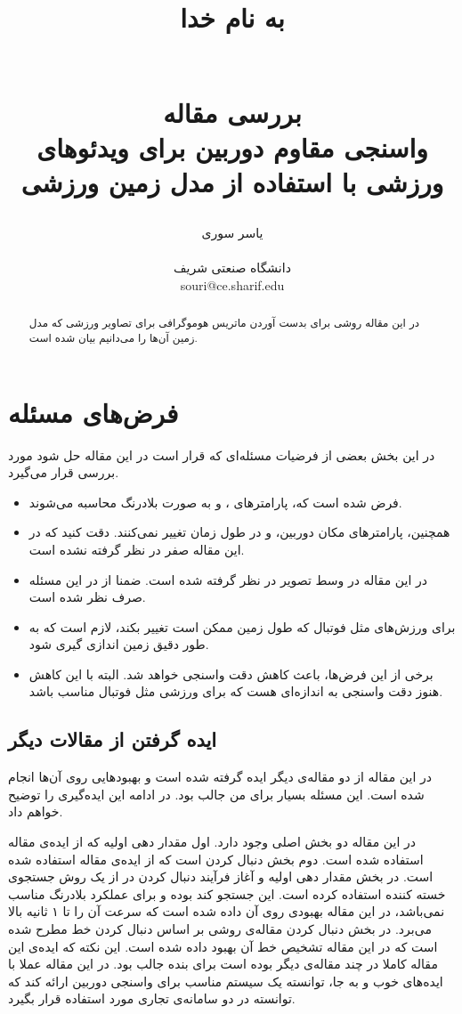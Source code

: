 \documentclass{report}
\title{
\begin{normalsize}
به نام خدا
\end{normalsize}
\\[2cm]
بررسی مقاله
\\[1cm]
واسنجی مقاوم دوربین برای ویدئوهای ورزشی با استفاده از مدل زمین ورزشی
}
\author{یاسر سوری
\\
\\ \small دانشگاه صنعتی شریف
\\ \small souri@ce.sharif.edu
}
\begin{document}
\maketitle

\begin{abstract}
در این مقاله روشی برای بدست آوردن ماتریس هوموگرافی برای تصاویر ورزشی که مدل زمین آن‌ها را می‌دانیم بیان شده است.

\end{abstract}

\section{فرض‌های مسئله}
در این بخش بعضی از فرضیات مسئله‌ای که قرار است در این مقاله حل شود مورد بررسی قرار می‌گیرد.
\begin{itemize}
\item
فرض شده است که، پارامتر‌های ،  و  به صورت بلادرنگ محاسبه می‌شوند.
\item
همچنین، پارامترهای مکان دوربین،  و  در طول زمان تغییر نمی‌کنند. دقت کنید که در این مقاله  صفر در نظر گرفته نشده است.
\item
در این مقاله  در وسط تصویر در نظر گرفته شده است. ضمنا از  در این مسئله صرف نظر شده است.
\item
برای ورزش‌های مثل فوتبال که طول زمین ممکن است تغییر بکند، لازم است که به طور دقیق زمین اندازی گیری شود.
\item
برخی از این فرض‌ها، باعث کاهش دقت واسنجی خواهد شد. البته با این کاهش هنوز دقت واسنجی به اندازه‌ای هست که برای ورزشی مثل فوتبال مناسب باشد.
\end{itemize}
\subsection{ایده گرفتن از مقالات دیگر}
در این مقاله از دو مقاله‌ی دیگر ایده گرفته شده است و بهبود‌هایی روی آن‌ها انجام شده است. این مسئله بسیار برای من جالب بود. در ادامه این ایده‌گیری را توضیح خواهم داد.

در این مقاله دو بخش اصلی وجود دارد. اول مقدار دهی اولیه  که از ایده‌ی مقاله \cite{ct16} استفاده شده است. دوم بخش دنبال کردن است که از ایده‌ی مقاله \cite{ct15} استفاده شده است. در بخش مقدار دهی اولیه و آغاز فرآیند دنبال کردن در \cite{ct16} از یک روش جستجوی خسته کننده  استفاده کرده است. این جستجو کند بوده و برای عملکرد بلادرنگ مناسب نمی‌باشد، در این مقاله بهبودی روی آن داده شده است که سرعت آن را تا ۱ ثانیه بالا می‌برد. در بخش دنبال کردن مقاله‌ی \cite{ct15} روشی بر اساس دنبال کردن خط مطرح شده است که در این مقاله تشخیص خط آن بهبود داده شده است.
این نکته که ایده‌ی این مقاله کاملا در چند مقاله‌ی دیگر بوده است برای بنده جالب بود. در این مقاله عملا با ایده‌های خوب و به جا، توانسته یک سیستم مناسب برای واسنجی دوربین ارائه کند که توانسته در دو سامانه‌ی تجاری مورد استفاده قرار بگیرد.
\end{document}
